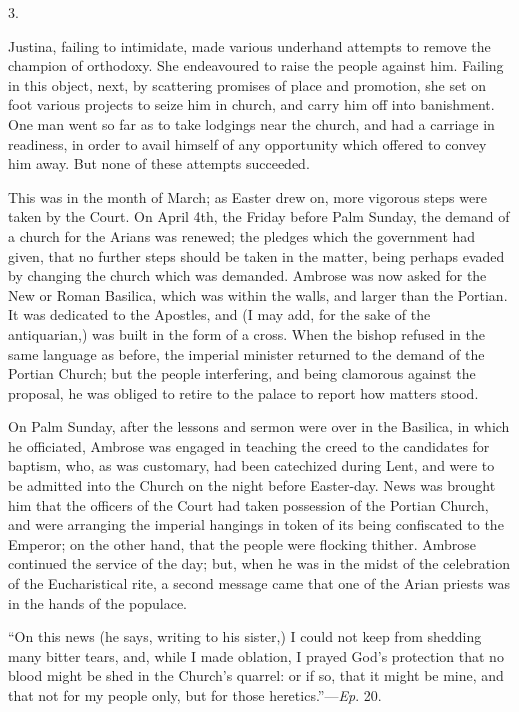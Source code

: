 3.

Justina, failing to intimidate, made various underhand attempts to
remove the champion of orthodoxy. She endeavoured to raise the people
against him. Failing in this object, next, by scattering promises of
place and promotion, she set on foot various projects to seize him in
church, and carry him off into banishment. One man went so far as to
take lodgings near the church, and had a carriage in readiness, in
order to avail himself of any opportunity which offered to convey him
away. But none of these attempts succeeded.

This was in the month of March; as Easter drew on, more vigorous
steps were taken by the Court. On April 4th, the Friday before Palm
Sunday, the demand of a church for the Arians was renewed; the pledges
which the government had given, that no further steps should be taken
in the matter, being perhaps evaded by changing the church which was
demanded. Ambrose was now asked for the New or Roman Basilica, which
was within the walls, and larger than the Portian. It was dedicated to
the Apostles, and (I may add, for the sake of the antiquarian,) was
built in the form of a cross. When the bishop refused in the same
language as before, the imperial minister returned to the demand of
the Portian Church; but the people interfering, and being clamorous
against the proposal, he was obliged to retire to the palace to report
how matters stood.

On Palm Sunday, after the lessons and sermon were over in the
Basilica, in which he officiated, Ambrose was engaged in
teaching the creed to the candidates for baptism, who, as was
customary, had been catechized during Lent, and were to be admitted
into the Church on the night before Easter-day. News was brought him
that the officers of the Court had taken possession of the Portian
Church, and were arranging the imperial hangings in token of its being
confiscated to the Emperor; on the other hand, that the people were
flocking thither. Ambrose continued the service of the day; but, when
he was in the midst of the celebration of the Eucharistical rite, a
second message came that one of the Arian priests was in the hands of
the populace.

``On this news (he says, writing to his sister,) I could not
keep from shedding many bitter tears, and, while I made oblation, I
prayed God's protection that no blood might be shed in the Church's
quarrel: or if so, that it might be mine, and that not for my people
only, but for those heretics.''—\emph{Ep}. 20.

